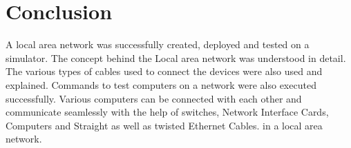 \documentclass[11pt]{article}
\begin{document}
\section{Conclusion}
A local area network was successfully created, deployed and tested on a simulator. The concept behind the Local area network was understood in detail. The various types of cables used to connect the devices were also used and explained. Commands to test computers on a network were also executed successfully. Various computers can be connected with each other and communicate seamlessly with the help of switches, Network Interface Cards, Computers and Straight as well as twisted Ethernet Cables.  in a local area network. 
\end{document}
